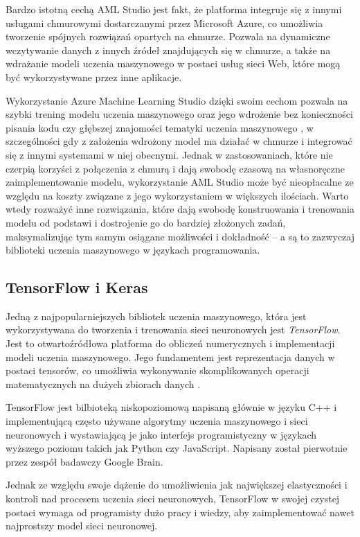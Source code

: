 Bardzo istotną cechą AML Studio jest fakt, że platforma integruje się z innymi usługami chmurowymi dostarczanymi przez Microsoft Azure, co umożliwia tworzenie spójnych rozwiązań opartych na chmurze.
Pozwala na dynamiczne wczytywanie danych z innych źródeł znajdujących się w chmurze, a także na wdrażanie modeli uczenia maszynowego w postaci usług sieci Web, które mogą być wykorzystywane przez inne aplikacje.

Wykorzystanie Azure Machine Learning Studio dzięki swoim cechom pozwala na szybki trening modelu uczenia maszynowego oraz jego wdrożenie bez konieczności pisania kodu czy głębszej znajomości tematyki uczenia maszynowego \cite{mukunthu2019practical}, w szczególności gdy z założenia wdrożony model ma działać w chmurze i integrować się z innymi systemami w niej obecnymi.
Jednak w zastosowaniach, które nie czerpią korzyści z połączenia z chmurą i dają swobodę czasową na własnoręczne zaimplementowanie modelu, wykorzystanie AML Studio może być nieopłacalne ze względu na koszty związane z jego wykorzystaniem w większych ilościach.
Warto wtedy rozważyć inne rozwiązania, które dają swobodę konstruowania i trenowania modelu od podstawi i dostrojenie go do bardziej złożonych zadań, maksymalizując tym samym osiągane możliwości i dokładność -- a są to zazwyczaj biblioteki uczenia maszynowego w językach programowania.

\subsection{TensorFlow i Keras}
\label{sec:tensorflow-and-keras}

Jedną z najpopularniejszych bibliotek uczenia maszynowego, która jest wykorzystywana do tworzenia i trenowania sieci neuronowych jest \emph{TensorFlow}.
Jest to otwartoźródłowa platforma do obliczeń numerycznych i implementacji modeli uczenia maszynowego.
Jego fundamentem jest reprezentacja danych w postaci tensorów, co umożliwia wykonywanie skomplikowanych operacji matematycznych na dużych zbiorach danych \cite{shukla2018machine}.

TensorFlow jest bilbioteką niskopoziomową napisaną głównie w języku C++ i implementującą często używane algorytmy uczenia maszynowego i sieci neuronowych i wystawiającą je jako interfejs programistyczny w językach wyższego poziomu takich jak Python czy JavaScript.
Napisany został pierwotnie przez zespół badawczy Google Brain.

Jednak ze względu swoje dążenie do umożliwienia jak największej elastyczności i kontroli nad procesem uczenia sieci neuronowych, TensorFlow w swojej czystej postaci wymaga od programisty dużo pracy i wiedzy, aby zaimplementować nawet najprostszy model sieci neuronowej.

